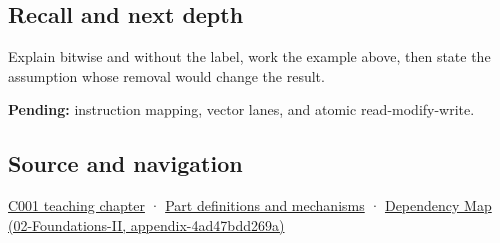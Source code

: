 \subsection{Recall and next depth}\label{recall-and-next-depth}

Explain bitwise and without the label, work the example above, then state the assumption whose removal would change the result.

\textbf{Pending:} instruction mapping, vector lanes, and atomic read-modify-write.

\subsection{Source and navigation}\label{source-and-navigation}

\href{Continuous\%20Notes/Computing\%20Foundations\%20-\%20From\%20Bits\%20to\%20C++\%20and\%20Systems\%20APIs\#From\%20a\%20signal\%20to\%20an\%20interpretation}{C001 teaching chapter} · \hyperref[appendix-fd090d982a15]{Part definitions and mechanisms} · \href{}{Dependency Map (02-Foundations-II, appendix-4ad47bdd269a)}
